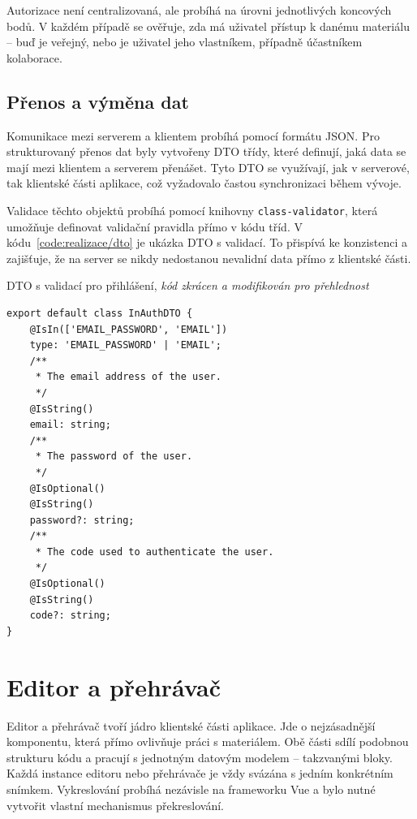 Autorizace není centralizovaná, ale probíhá na úrovni jednotlivých koncových bodů. 
V každém případě se ověřuje, zda má uživatel přístup k danému materiálu -- buď je veřejný, nebo je uživatel jeho vlastníkem, případně účastníkem kolaborace.

\subsection{Přenos a výměna dat}

Komunikace mezi serverem a klientem probíhá pomocí formátu JSON.
Pro strukturovaný přenos dat byly vytvořeny DTO třídy, které definují, jaká data se mají mezi klientem a serverem přenášet. 
Tyto DTO se využívají, jak v serverové, tak klientské části aplikace, což vyžadovalo častou synchronizaci během vývoje.

Validace těchto objektů probíhá pomocí knihovny \texttt{class-validator}, která umožňuje definovat validační pravidla přímo v kódu tříd.
V kódu~\ref{code:realizace/dto} je ukázka DTO s validací.
To přispívá ke konzistenci a zajišťuje, že na server se nikdy nedostanou nevalidní data přímo z klientské části.


\begin{listing}[ht!]
\caption[DTO s validací pro přihlášení]{DTO s validací pro přihlášení, \textit{kód zkrácen a modifikován pro přehlednost}}\label{code:realizace/dto}
\begin{verbatim}
export default class InAuthDTO {
    @IsIn(['EMAIL_PASSWORD', 'EMAIL'])
    type: 'EMAIL_PASSWORD' | 'EMAIL';
    /**
     * The email address of the user.
     */
    @IsString()
    email: string;
    /**
     * The password of the user.
     */
    @IsOptional()
    @IsString()
    password?: string;
    /**
     * The code used to authenticate the user.
     */
    @IsOptional()
    @IsString()
    code?: string;
}
\end{verbatim}
\end{listing}

\section{Editor a přehrávač}\label{text:realizace/editor}

Editor a přehrávač tvoří jádro klientské části aplikace. 
Jde o nejzásadnější komponentu, která přímo ovlivňuje práci s materiálem. 
Obě části sdílí podobnou strukturu kódu a pracují s jednotným datovým modelem -- takzvanými bloky. 
Každá instance editoru nebo přehrávače je vždy svázána s jedním konkrétním snímkem. 
Vykreslování probíhá nezávisle na frameworku Vue a bylo nutné vytvořit vlastní mechanismus překreslování.

